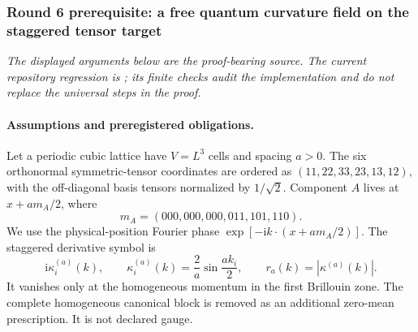 \subsubsection*{Round 6 prerequisite: a free quantum curvature field on the staggered tensor target}
\label{sec:toe-r6-quantum}
\noindent\emph{The displayed arguments below are the proof-bearing source.  The current
repository regression is ; its finite checks audit the
implementation and do not replace the universal steps in the proof.}

\begingroup
\def\TT{\mathrm{TT}}
\def\Ran{\operatorname{Ran}}
\def\Ker{\operatorname{Ker}}
\def\Tr{\operatorname{Tr}}
\def\ii{\mathrm{i}}
\def\dd{\mathrm{d}}
\def\cC{\mathcal C}
\def\cS{\mathcal S}
\def\cW{\mathcal W}
\begin{center}
\end{center}

\paragraph{Assumptions and preregistered obligations.}

Let a periodic cubic lattice have $V=L^3$ cells and spacing $a>0$.  The six
orthonormal symmetric-tensor coordinates are ordered as
$(11,22,33,23,13,12)$, with the off-diagonal basis tensors normalized by
$1/\sqrt2$.  Component $A$ lives at $x+a m_A/2$, where
\[
 m_A=(000,000,000,011,101,110).
\]
We use the physical-position Fourier phase
$\exp[-\ii k\cdot(x+a m_A/2)]$.  The staggered derivative symbol is
\[
 \ii\kappa_i^{(a)}(k),\qquad
 \kappa_i^{(a)}(k)=\frac{2}{a}\sin\frac{ak_i}{2},\qquad
 r_a(k)=|\kappa^{(a)}(k)|.
\]
It vanishes only at the homogeneous momentum in the first Brillouin zone.
The complete homogeneous canonical block is removed as an additional
zero-mean prescription.  It is not declared gauge.

